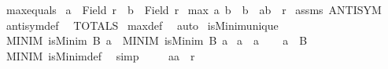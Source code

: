 \begin{isabellebody}
\isanewline
%
\endisadelimproof
\isanewline
{}\isamarkupfalse%
\ max{}{\isacharunderscore}{\kern0pt}equals{}{\isacharcolon}{\kern0pt}\isanewline
{}\ {\isachardoublequoteopen}a\ {\isasymin}\ Field\ r{\isachardoublequoteclose}\ \ {\isachardoublequoteopen}b\ {\isasymin}\ Field\ r{\isachardoublequoteclose}\isanewline
{}\ {\isachardoublequoteopen}{\isacharparenleft}{\kern0pt}max{}\ a\ b\ {\isacharequal}{\kern0pt}\ b{\isacharparenright}{\kern0pt}\ {\isacharequal}{\kern0pt}\ {\isacharparenleft}{\kern0pt}{\isacharparenleft}{\kern0pt}a{\isacharcomma}{\kern0pt}b{\isacharparenright}{\kern0pt}\ {\isasymin}\ r{\isacharparenright}{\kern0pt}{\isachardoublequoteclose}\isanewline
%
\isadelimproof
%
\endisadelimproof
%
\isatagproof
{}\isamarkupfalse%
\ assms\ ANTISYM\ \isamarkupfalse%
\ antisym{\isacharunderscore}{\kern0pt}def\ \isamarkupfalse%
\ TOTALS\isanewline
{}\isamarkupfalse%
\ max{}{\isacharunderscore}{\kern0pt}def\ \isamarkupfalse%
\ auto%
\endisatagproof
{\isafoldproof}%
%
\isadelimproof
%
\endisadelimproof
%
\isadelimdocument
%
\endisadelimdocument
%
\isatagdocument
%
\isamarkuptrue%
%
\endisatagdocument
{\isafolddocument}%
%
\isadelimdocument
%
\endisadelimdocument
{}\isamarkupfalse%
\ isMinim{\isacharunderscore}{\kern0pt}unique{\isacharcolon}{\kern0pt}\isanewline
{}\ MINIM{\isacharcolon}{\kern0pt}\ {\isachardoublequoteopen}isMinim\ B\ a{\isachardoublequoteclose}\ \ MINIM{\isacharprime}{\kern0pt}{\isacharcolon}{\kern0pt}\ {\isachardoublequoteopen}isMinim\ B\ a{\isacharprime}{\kern0pt}{\isachardoublequoteclose}\isanewline
{}\ {\isachardoublequoteopen}a\ {\isacharequal}{\kern0pt}\ a{\isacharprime}{\kern0pt}{\isachardoublequoteclose}\isanewline
%
\isadelimproof
%
\endisadelimproof
%
\isatagproof
{}\isamarkupfalse%
{\isacharminus}{\kern0pt}\isanewline
\ \ \isacommand{{\isacharbraceleft}{\kern0pt}}\isamarkupfalse%
\isamarkupfalse%
\ {\isachardoublequoteopen}a\ {\isasymin}\ B{\isachardoublequoteclose}\isanewline
\ \ \ \isamarkupfalse%
\ MINIM\ isMinim{\isacharunderscore}{\kern0pt}def\ \isamarkupfalse%
\ simp\isanewline
\ \ \ \isamarkupfalse%
\ {\isachardoublequoteopen}{\isacharparenleft}{\kern0pt}a{\isacharprime}{\kern0pt}{\isacharcomma}{\kern0pt}a{\isacharparenright}{\kern0pt}\ {\isasymin}\ r{\isachardoublequoteclose}\isanewline

\end{isabellebody}
